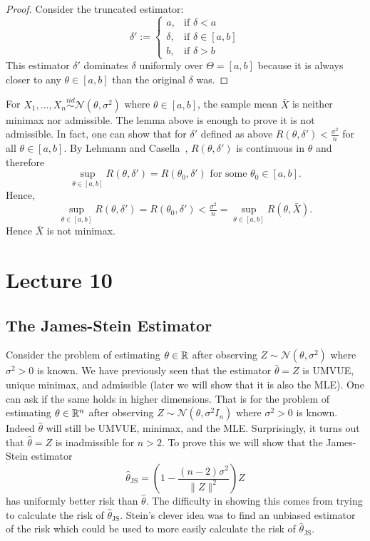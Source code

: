\begin{proof}
	Consider the truncated estimator:
	$$\delta' := \begin{cases} a, & \text{if } \delta < a \\ \delta, & \text{if } \delta \in [a, b] \\ b, & \text{if } \delta > b \end{cases}$$
	This estimator $\delta'$ dominates $\delta$ uniformly over $\Theta = [a, b]$ because it is always closer to any $\theta \in [a, b]$ than the original $\delta$ was.
\end{proof}

\begin{example}
	For $X_1, \dots, X_n \overset{iid}{\sim} \mathcal N(\theta, \sigma^2)$ where $\theta \in [a, b]$, the sample mean $\bar{X}$ is neither minimax nor admissible. The lemma above is enough to prove it is not admissible. In fact, one can show that for $\delta'$ defined as above $R(\theta, \delta') < \frac{\sigma^2}{n}$ for all $\theta \in [a, b]$. By Lehmann and Casella~\cite[Theorem 1.5.8, p.~27]{LehmannCasella1998}, $R(\theta, \delta')$ is continuous in $\theta$ and therefore \[
		\sup_{\theta \in [a, b]} R(\theta, \delta') = R(\theta_0, \delta') \text{ for some } \theta_0 \in [a, b].
	\] Hence, \[
		\sup_{\theta \in [a, b]} R(\theta, \delta') = R(\theta_0, \delta') < \tfrac{\sigma^2}{n} = \sup_{\theta \in [a, b]} R(\theta, \bar{X}).
	\] Hence $\bar{X}$ is not minimax.
\end{example}



\newpage
\section{Lecture 10}

\subsection{The James-Stein Estimator}

Consider the problem of estimating $\theta \in \mathbb{R}$ after observing $Z \sim \mathcal{N}(\theta, \sigma^2)$ where $\sigma^2 > 0$ is known. We have previously seen that the estimator $\hat \theta = Z$ is UMVUE, unique minimax, and admissible (later we will show that it is also the MLE). One can ask if the same holds in higher dimensions. That is for the problem of estimating $\theta \in \mathbb{R}^n$ after observing $Z \sim \mathcal{N}(\theta, \sigma^2 I_n)$ where $\sigma^2 > 0$ is known. Indeed $\hat \theta$ will still be UMVUE, minimax, and the MLE. Surprisingly, it turns out that $\hat \theta = Z$ is inadmissible for $n > 2$. To prove this we will show that the James-Stein estimator \[
	\hat{\theta}_{\text{JS}} = \left(1 - \frac{(n-2)\sigma^2 }{\|Z\|^2}\right) Z
\] has uniformly better risk than $\hat \theta$. The difficulty in showing this comes from trying to calculate the risk of $\hat{\theta}_{\text{JS}}$. Stein's clever idea was to find an unbiased estimator of the risk which could be used to more easily calculate the risk of $\hat{\theta}_{\text{JS}}$.

